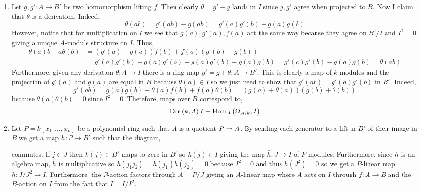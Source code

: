 \documentclass[12pt]{article}
\begin{document}
\begin{enumerate}
\item Let $g, g' : A \to B'$ be two homomorphism lifting $f$. Then clearly $\theta = g' - g$ lands in $I$ since $g, g'$ agree when projected to $B$. Now I claim that $\theta$ is a derivation. Indeed,
\[ \theta(ab) = g'(ab) - g(ab) = g'(a) g'(b) - g(a) g(b) \]
However, notice that for multiplication on $I$ we see that $g(a), g'(a), f(a)$ act the same way because they agree on $B'/I$ and $I^2 = 0$ giving a unique $A$-module structure on $I$. Thus,
\begin{align*}
\theta(a) b  + a \theta(b) & = (g'(a) - g(a)) f(b) + f(a)(g'(b) - g(b)) 
\\
& = g'(a) g'(b) - g(a) g'(b) + g(a) g'(b) - g(a) g(b) = g'(a) g'(b) - g(a) g(b) = \theta(ab)
\end{align*}
Furthermore, given any derivation $\theta : A \to I$ there is a ring map $g' = g + \theta : A \to B'$. This is clearly a map of $k$-modules and the projection of $g'(a)$ and $g(a)$ are equal in $B$ because $\theta(a) \in I$ so we just need to show that $g'(ab) = g'(a) g'(b)$ in $B'$. Indeed,
\[ g'(ab) = g(a) g(b) + \theta(a) f(b) + f(a) \theta(b) = (g(a) + \theta(a))(g(b) + \theta(b)) \]
because $\theta(a) \theta(b) = 0$ since $I^2 = 0$. Therefore, maps over $B$ correspond to,
\[ \mathrm{Der}_{} \left( k, A \right){I} = \mathrm{Hom}_{A} \left( \Omega_{A/k}, I \right) \]

\item Let $P = k[x_1, \dots, x_n]$ be a polynomial ring such that $A$ is a quotient $P \twoheadrightarrow A$. By sending each generator to a lift in $B'$ of their image in $B$ we get a map $h : P \to B'$ such that the diagram,
\begin{center}
\end{center}
commutes. If $j \in J$ then $h(j) \in B'$ maps to zero in $B'$ so $h(j) \in I$ giving the map $\bar{h} : J \to I$ of $P$-modules. Furthermore, since $h$ is an algebra map, $\bar{h}$ is multiplicative so $\bar{h}(j_1 j_2) = \bar{h}(j_1) \bar{h}(j_2) = 0$ because $I^2 = 0$ and thus $\bar{h}(J^2) = 0$ so we get a $P$-linear map $\bar{h} : J/J^2 \to I$. Furthermore, the $P$-action factors through $A = P/J$ giving an $A$-linear map where $A$ acts on $I$ through $f : A \to B$ and the $B$-action on $I$ from the fact that $I = I/I^2$.


\end{enumerate}
\end{document}

